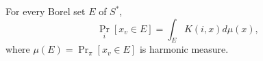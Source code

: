 For every Borel set $E$ of $S^*$,
$$\Pr_i[x_v \in E] = \int_E K(i, x) d\mu(x),$$
where $\mu(E) = \Pr_\pi[x_v \in E]$ is harmonic measure.

